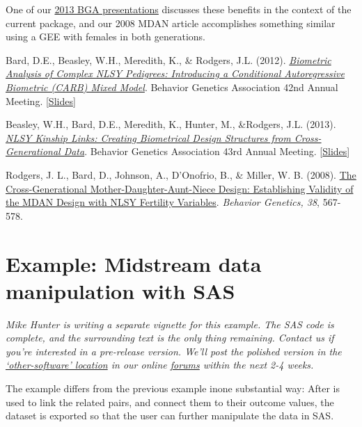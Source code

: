 \documentclass{article}\usepackage[]{graphicx}\usepackage[]{color}
\begin{document}
One of our \href{https://r-forge.r-project.org/forum/forum.php?thread_id=28498&forum_id=4266&group_id=1330}{2013 BGA presentations}  discusses these benefits in the context of the current  package, and our 2008 MDAN article accomplishes something similar using a GEE with females in both generations.

Bard, D.E., Beasley, W.H., Meredith, K., \& Rodgers, J.L. (2012). \href{http://link.springer.com/article/10.1007/s10519-012-9566-6}{\emph{Biometric Analysis of Complex NLSY Pedigrees: Introducing a Conditional Autoregressive Biometric (CARB) Mixed Model}}. Behavior Genetics Association 42nd Annual Meeting. [\href{https://r-forge.r-project.org/forum/forum.php?thread_id=4761&forum_id=4266&group_id=1330}{Slides}]

Beasley, W.H., Bard, D.E., Meredith, K., Hunter, M., \&Rodgers, J.L. (2013). \href{http://link.springer.com/article/10.1007/s10519-013-9623-9}{\emph{NLSY Kinship Links:  Creating Biometrical Design Structures from Cross-Generational Data}}. Behavior Genetics Association 43rd Annual Meeting. [\href{https://r-forge.r-project.org/forum/forum.php?thread_id=28498&forum_id=4266&group_id=1330}{Slides}]

Rodgers, J. L., Bard, D., Johnson, A., D'Onofrio, B., \& Miller, W. B. (2008). \href{http://www.ncbi.nlm.nih.gov/pubmed/18825497}{The Cross-Generational Mother-Daughter-Aunt-Niece Design: Establishing Validity of the MDAN Design with NLSY Fertility Variables}. \emph{Behavior Genetics, 38}, 567-578.


\section{Example: Midstream data manipulation with SAS}
\emph{Mike Hunter is writing a separate vignette for this example.  The SAS code is complete, and the surrounding text is the only thing remaining.  Contact us if you're interested in a pre-release version.  We'll post the polished version in the \href{https://r-forge.r-project.org/forum/forum.php?forum_id=4316&group_id=1330}{`other-software' location} in our online \href{https://r-forge.r-project.org/forum/?group_id=1330}{forums} within the next 2-4 weeks. }

The example differs from the previous example  inone substantial way: After \R{} is used to link the related pairs, and connect them to their outcome values, the dataset is exported so that the user can further manipulate the data in SAS.  
\end{document}
